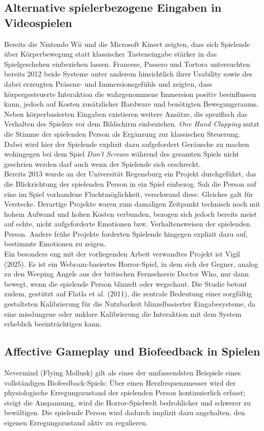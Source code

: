 \documentclass[intern]{cgMA}
\begin{document}
\subsection{Alternative spielerbezogene Eingaben in Videospielen}
Bereits die Nintendo Wii und die Microsoft Kinect zeigten, dass sich Spielende über Körperbewegung statt klassischer Tasteneingabe stärker in das Spielgeschehen einbeziehen lassen. Francese, Passero und Tortora \cite{wiiKinect} untersuchten bereits 2012 beide Systeme unter anderem hinsichtlich ihrer Usability sowie des dabei erzeugten Präsenz- und Immersionsgefühls und zeigten, dass körpergesteuerte Interaktion die wahrgenommene Immersion positiv beeinflussen kann, jedoch auf Kosten zusätzlicher Hardware und benötigten Bewegungsraums.\\
Neben körperbasierten Eingaben existieren weitere Ansätze, die spezifisch das Verhalten des Spielers vor dem Bildschirm einbeziehen. \textit{One Hand Clapping} nutzt die Stimme der spielenden Person als Ergänzung zur klassischen Steuerung. Dabei wird hier der Spielende explizit dazu aufgefordert Geräusche zu machen wohingegen bei dem Spiel \textit{Don't Scream} während des gesamten Spiels nicht geschrien werden darf auch wenn der Spielende sich erschreckt.\\
Bereits 2013 wurde an der Universität Regensburg ein Projekt durchgeführt, das die Blickrichtung der spielenden Person in ein Spiel einbezog. Sah die Person auf eine im Spiel vorhandene Fluchtmöglichkeit, verschwand diese. Gleiches galt für Verstecke. Derartige Projekte waren zum damaligen Zeitpunkt technisch noch mit hohem Aufwand und hohen Kosten verbunden, bezogen sich jedoch bereits meist auf echte, nicht aufgeforderte Emotionen bzw. Verhaltensweisen der spielenden Person.\cite{regensburg2013sophia} Andere frühe Projekte forderten Spielende hingegen explizit dazu auf, bestimmte Emotionen zu zeigen.\\
Ein besonders eng mit der vorliegenden Arbeit verwandtes Projekt ist Vigil (2025). Es ist ein Webcam-basiertes Horror-Spiel, in dem sich der Gegner, analog zu den Weeping Angels aus der britischen Fernsehserie Doctor Who, nur dann bewegt, wenn die spielende Person blinzelt oder wegschaut. Die Studie betont zudem, gestützt auf Flatla et al. (2011)\cite{calibrationFlatla}, die zentrale Bedeutung einer sorgfältig gestalteten Kalibrierung für die Nutzbarkeit blinzelbasierter Eingabesysteme, da eine misslungene oder unklare Kalibrierung die Interaktion mit dem System erheblich beeinträchtigen kann.\cite{vigilBlink}
\subsection{Affective Gameplay und Biofeedback in Spielen}
Nevermind (Flying Mollusk) gilt als eines der umfassendsten Beispiele eines vollständigen Biofeedback-Spiels: Über einen Herzfrequenzmesser wird der physiologische Erregungszustand der spielenden Person kontinuierlich erfasst; steigt die Anspannung, wird die Horror-Spielwelt bedrohlicher und schwerer zu bewältigen. Die spielende Person wird dadurch implizit dazu angehalten, den eigenen Erregungszustand aktiv zu regulieren.
\end{document}

